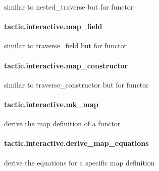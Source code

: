\documentclass{article}
\begin{document}
\par
similar to 
\colorbox[RGB]{253,246,227}{{{{\color[RGB]{101, 123, 131} nested\_traverse }}}} but for 
\colorbox[RGB]{253,246,227}{{{{\color[RGB]{101, 123, 131} functor }}}}\paragraph{tactic.interactive.map\_field}
\par
similar to 
\colorbox[RGB]{253,246,227}{{{{\color[RGB]{101, 123, 131} traverse\_field }}}} but for 
\colorbox[RGB]{253,246,227}{{{{\color[RGB]{101, 123, 131} functor }}}}\paragraph{tactic.interactive.map\_constructor}
\par
similar to 
\colorbox[RGB]{253,246,227}{{{{\color[RGB]{101, 123, 131} traverse\_constructor }}}} but for 
\colorbox[RGB]{253,246,227}{{{{\color[RGB]{101, 123, 131} functor }}}}\paragraph{tactic.interactive.mk\_map}
\par
derive the 
\colorbox[RGB]{253,246,227}{{{{\color[RGB]{101, 123, 131} map }}}} definition of a 
\colorbox[RGB]{253,246,227}{{{{\color[RGB]{101, 123, 131} functor }}}}\paragraph{tactic.interactive.derive\_map\_equations}
\par
derive the equations for a specific 
\colorbox[RGB]{253,246,227}{{{{\color[RGB]{101, 123, 131} map }}}} definition
\end{document}
